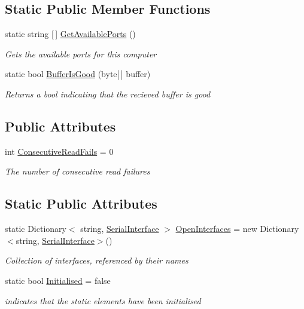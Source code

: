 \subsection*{Static Public Member Functions}
\begin{DoxyCompactItemize}
\item 
static string \mbox{[}$\,$\mbox{]} \hyperlink{class_accumulator_monitor_m017_1_1_backend_1_1_serial_interface_a1c632b2dbcecc22017f24693e7bdbcce}{Get\+Available\+Ports} ()
\begin{DoxyCompactList}\small\item\em Gets the available ports for this computer \end{DoxyCompactList}\item 
static bool \hyperlink{class_accumulator_monitor_m017_1_1_backend_1_1_serial_interface_a6e1ce1196642765d615e0e137bd6654c}{Buffer\+Is\+Good} (byte\mbox{[}$\,$\mbox{]} buffer)
\begin{DoxyCompactList}\small\item\em Returns a bool indicating that the recieved buffer is good \end{DoxyCompactList}\end{DoxyCompactItemize}
\subsection*{Public Attributes}
\begin{DoxyCompactItemize}
\item 
int \hyperlink{class_accumulator_monitor_m017_1_1_backend_1_1_serial_interface_aa3cfa9b63909cd75926e190253e2abee}{Consecutive\+Read\+Fails} = 0
\begin{DoxyCompactList}\small\item\em The number of consecutive read failures \end{DoxyCompactList}\end{DoxyCompactItemize}
\subsection*{Static Public Attributes}
\begin{DoxyCompactItemize}
\item 
static Dictionary$<$ string, \hyperlink{class_accumulator_monitor_m017_1_1_backend_1_1_serial_interface}{Serial\+Interface} $>$ \hyperlink{class_accumulator_monitor_m017_1_1_backend_1_1_serial_interface_ad1557a0bd747db3c1a8e14b57447b2e2}{Open\+Interfaces} = new Dictionary$<$string, \hyperlink{class_accumulator_monitor_m017_1_1_backend_1_1_serial_interface}{Serial\+Interface}$>$()
\begin{DoxyCompactList}\small\item\em Collection of interfaces, referenced by their names \end{DoxyCompactList}\item 
static bool \hyperlink{class_accumulator_monitor_m017_1_1_backend_1_1_serial_interface_a2586c85ca5a05e10d9f0c323bf4de3af}{Initialised} = false
\begin{DoxyCompactList}\small\item\em indicates that the static elements have been initialised \end{DoxyCompactList}\end{DoxyCompactItemize}
